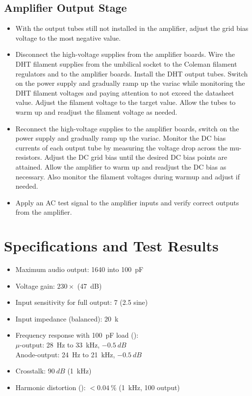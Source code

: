 \subsection{Amplifier Output Stage}
\begin{itemize}
\item With the output tubes still not installed in the amplifier, adjust the grid bias voltage to the most negative value.
\item Disconnect the high-voltage supplies from the amplifier boards. Wire the DHT filament supplies from the umbilical socket to the Coleman filament regulators and to the amplifier boards. Install the DHT output tubes. Switch on the power supply and gradually ramp up the variac while monitoring the DHT filament voltages and paying attention to not exceed the datasheet value. Adjust the filament voltage to the target value. Allow the tubes to warm up and readjust the filament voltage as needed.
\item Reconnect the high-voltage supplies to the amplifier boards, switch on the power supply and gradually ramp up the variac. Monitor the DC bias currents of each output tube by measuring the voltage drop across the mu-resistors. Adjust the DC grid bias until the desired DC bias points are attained. Allow the amplifier to warm up and readjust the DC bias as necessary. Also monitor the filament voltages during warmup and adjust if needed.
\item Apply an AC test signal to the amplifier inputs and verify correct outputs from the amplifier.

\end{itemize}


\section{Specifications and Test Results}

\begin{itemize}
  \item Maximum audio output: \SI{1640}{\unitVpp} into \SI{100}{pF}
  \item Voltage gain: $230 \times$ (\SI{47}{dB})
  \item Input sensitivity for full output: \SI{7}{\unitVpp} (\SI{2.5}{\unitVrms} sine)
  \item Input impedance (balanced): \SI{20}{k\Ohm}
  \item Frequency response with \SI{100}{pF} load ():\\
        $\mu$-output: \SI{28}{Hz} to \SI{33}{kHz}, $-\SI{0.5}{dB}$\\
        Anode-output: \SI{24}{Hz} to \SI{21}{kHz}, $-\SI{0.5}{dB}$
  \item Crosstalk: $\SI{90}{dB}$ (\SI{1}{kHz})
  \item Harmonic distortion (): $< \SI{0.04}{\%}$ (\SI{1}{kHz}, \SI{100}{\unitVrms} output)
\end{itemize}

